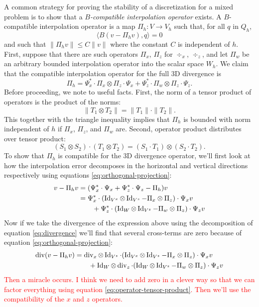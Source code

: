 \documentclass{article}
\theoremstyle{definition}
\theoremstyle{plain}
\renewcommand{\div}[1]{\operatorname{div} #1} %
\newcommand{\Id}[1]{\operatorname{Id} #1}
\begin{document}
A common strategy for proving the stability of a discretization for a mixed problem is to show that a \emph{$B$-compatible interpolation operator} exists.
A $B$-compatible interpolation operator is a map $\Pi_h : V \to V_h$ such that, for all $q$ in $Q_h$,
\begin{equation}
    \langle B(v - \Pi_hv), q\rangle = 0
\end{equation}
and such that $\|\Pi_hv\| \le C\|v\|$ where the constant $C$ is independent of $h$.
First, suppose that there are such operators $\Pi_x$, $\Pi_z$ for $\div_x$, $\div_z$, and let $\Pi_w$ be an arbitrary bounded interpolation operator into the scalar space $W_h$.
We claim that the compatible interpolation operator for the full 3D divergence is
\begin{equation}
    \Pi_h = \Psi_x^*\cdot\Pi_x\otimes\Pi_z\cdot\Psi_x + \Psi_z^*\cdot\Pi_w\otimes\Pi_z\cdot\Psi_z.
    \label{eq:pi-h}
\end{equation}
Before proceeding, we note to useful facts.
First, the norm of a tensor product of operators is the product of the norms:
\begin{equation}
    \|T_1 \otimes T_2\| = \|T_1\|\cdot\|T_2\|.
\end{equation}
This together with the triangle inequality implies that $\Pi_h$ is bounded with norm independent of $h$ if $\Pi_x$, $\Pi_z$, and $\Pi_w$ are.
Second, operator product distributes over tensor product:
\begin{equation}
    (S_1 \otimes S_2) \cdot (T_1 \otimes T_2) = (S_1 \cdot T_1) \otimes (S_2 \cdot T_2).
    \label{eq:operator-tensor-product}
\end{equation}
To show that $\Pi_h$ is compatible for the 3D divergence operator, we'll first look at how the interpolation error decomposes in the horizontal and vertical directions respectively using equations \eqref{eq:orthogonal-projection}:
\begin{align}
    v - \Pi_h v & = (\Psi_x^*\cdot\Psi_x + \Psi_z^*\cdot\Psi_z - \Pi_h) v \\
    & = \Psi_x^*\cdot(\Id_{V^x}\otimes\Id_{V^z} - \Pi_x\otimes\Pi_z)\cdot\Psi_xv \nonumber \\
    & \qquad + \Psi_z^*\cdot(\Id_W\otimes\Id_{V^z} - \Pi_w\otimes\Pi_z)\cdot\Psi_zv
\end{align}
Now if we take the divergence of the expression above using the decomposition of equation \eqref{eq:divergence} we'll find that several cross-terms are zero because of equation \eqref{eq:orthogonal-projection}:
\begin{align}
    \div(v - \Pi_h v) & = \div_x\otimes \Id_{V^z}\cdot(\Id_{V^x}\otimes\Id_{V^z} - \Pi_x\otimes\Pi_z)\cdot\Psi_xv \nonumber \\
    & \qquad + \Id_W\otimes\div_z\cdot(\Id_W\otimes\Id_{V^z} - \Pi_w\otimes\Pi_z)\cdot\Psi_zv
\end{align}
\textcolor{red}{Then a miracle occurs.
I think we need to add zero in a clever way so that we can factor everything using equation \eqref{eq:operator-tensor-product}.
Then we'll use the compatibility of the $x$ and $z$ operators.}


\pagebreak



\end{document}
